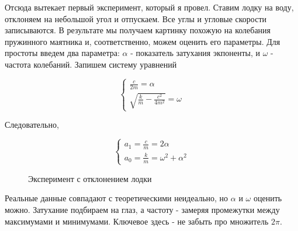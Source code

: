 \documentclass[12pt,a4paper]{article}
\begin{document}
Отсюда вытекает первый эксперимент, который я провел. Ставим лодку на воду, отклоняем на небольшой угол и отпускаем. Все углы и угловые скорости записываются. В результате мы получаем картинку похожую на колебания пружинного маятника и, соответственно, можем оценить его параметры. Для простоты введем два параметра: $\alpha$ - показатель затухания экпоненты, и $\omega$ - частота колебаний. Запишем систему уравнений

\begin{equation*}
	\begin{cases}
		\frac{c}{2m} = \alpha
		\\
		\sqrt{\frac{k}{m} - \frac{c^2}{4m^2}} = \omega
	\end{cases}
\end{equation*}

Следовательно, 

\begin{equation*}
	\begin{cases}
		a_1 = \frac{c}{m} = 2\alpha
		\\
		a_0 = \frac{k}{m} = \omega^2 + \alpha^2
	\end{cases}
\end{equation*}

\begin{figure}[h]
	\caption{Эксперимент с отклонением лодки}
\end{figure}

Реальные данные совпадают с теоретическими неидеально, но $\alpha$ и $\omega$ оценить можно. Затухание подбираем на глаз, а частоту - замеряя промежутки между максимумами и минимумами. Ключевое здесь - не забыть про множитель $2\pi$.
\end{document}

